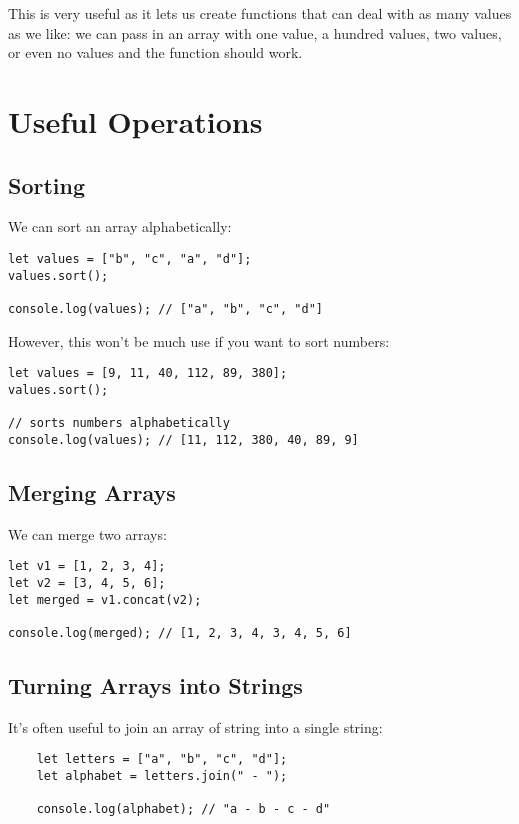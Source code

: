 This is very useful as it lets us create functions that can deal with as many values as we like: we can pass in an array with one value, a hundred values, two values, or even no values and the function should work.

\pagebreak

\section{Useful Operations}

\subsection{Sorting}

We can sort an array alphabetically:

\begin{verbatim}
let values = ["b", "c", "a", "d"];
values.sort();

console.log(values); // ["a", "b", "c", "d"]
\end{verbatim}

However, this won't be much use if you want to sort numbers:

\begin{verbatim}
let values = [9, 11, 40, 112, 89, 380];
values.sort();

// sorts numbers alphabetically
console.log(values); // [11, 112, 380, 40, 89, 9]
\end{verbatim}


\subsection{Merging Arrays}

We can merge two arrays:

\begin{verbatim}
let v1 = [1, 2, 3, 4];
let v2 = [3, 4, 5, 6];
let merged = v1.concat(v2);

console.log(merged); // [1, 2, 3, 4, 3, 4, 5, 6]
\end{verbatim}

\subsection{Turning Arrays into Strings}

It's often useful to join an array of string into a single string:

\begin{verbatim}
    let letters = ["a", "b", "c", "d"];
    let alphabet = letters.join(" - ");

    console.log(alphabet); // "a - b - c - d"
\end{verbatim}

